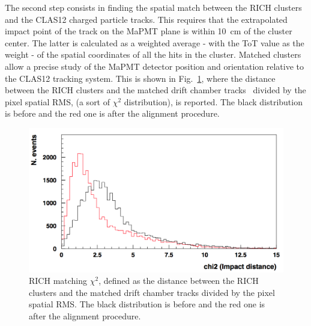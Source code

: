 \documentclass[5p,times,twocolumn]{elsarticle}
\def\MaPMT{MaPMT }
\begin{document}

The second step consists in finding the spatial match between the RICH clusters and the CLAS12 charged particle tracks. This requires
that the extrapolated impact point of the track on the MaPMT plane is within 10~cm of the cluster center. The latter
is calculated as a weighted average - with the ToT value as the weight - of the spatial coordinates of all the hits in the
cluster. Matched clusters allow a precise study of the MaPMT detector position and orientation relative to the CLAS12
tracking system. This is shown in Fig.~\ref{Fig:DCmatch}, where the distance between the RICH clusters and the matched 
drift chamber tracks~\cite{REF:dc-nim} divided by the pixel spatial RMS, (a sort of $\chi^2$ distribution), is reported. The black
distribution is before and the red one is after the alignment procedure.

\begin{figure}[t]
\begin{center}
\includegraphics[width=1.0\columnwidth]{ckmaca.png}
\end{center}
\caption{RICH matching $\chi^2$, defined as the distance between the RICH clusters and the matched drift chamber tracks divided by the
  pixel spatial RMS. The black distribution is before and the red one is after the alignment procedure.}
\label{Fig:DCmatch}
\end{figure}
\end{document}
